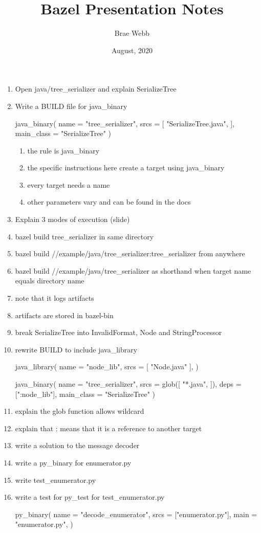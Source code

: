 \documentclass{article}
\title{Bazel Presentation Notes}
\author{Brae Webb}
\date{August, 2020}
\begin{document}
    \maketitle

\begin{enumerate}
    \item Open java/tree\_serializer and explain SerializeTree
    \item Write a BUILD file for java\_binary
\begin{bazel}
java_binary(
    name = "tree_serializer",
    srcs = [
        "SerializeTree.java",
    ],
    main_class = "SerializeTree"
)
\end{bazel}
    \begin{enumerate}
        \item the rule is java\_binary
        \item the specific instructions here create a target using java\_binary
        \item every target needs a name
        \item other parameters vary and can be found in the docs
    \end{enumerate}
    \item Explain 3 modes of execution (slide)
    \item bazel build tree\_serializer in same directory
    \item bazel build //example/java/tree\_serializer:tree\_serializer from anywhere
    \item bazel build //example/java/tree\_serializer as shorthand when target
    name equals directory name
    \item note that it logs artifacts
    \item artifacts are stored in bazel-bin
    \item break SerializeTree into InvalidFormat, Node and StringProcessor
    \item rewrite BUILD to include java\_library
\begin{bazel}
java_library(
    name = "node_lib",
    srcs = [
        "Node.java"
    ],
)

java_binary(
    name = "tree_serializer",
    srcs = glob([
        "*.java",
    ]),
    deps = [":node_lib"],
    main_class = "SerializeTree"
)    
\end{bazel}
    \item explain the glob function allows wildcard
    \item explain that : means that it is a reference to another target
    \item write a solution to the message decoder
    \item write a py\_binary for enumerator.py
    \item write test\_enumerator.py
    \item write a test for py\_test for test\_enumerator.py
\begin{bazel}
py_binary(
    name = "decode_enumerator",
    srcs = ["enumerator.py"],
    main = "enumerator.py",
)


\end{bazel}
\end{enumerate}
\end{document}
